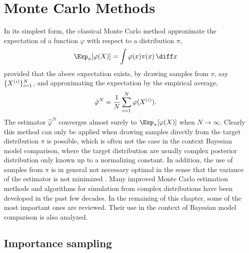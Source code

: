 \chapter{Monte Carlo Methods}
\label{cha:Monte Carlo Methods}

In its simplest form, the classical Monte Carlo method approximate the
expectation of a function $\varphi$ with respect to a distribution $\pi$,
\begin{equation}
  \Exp_{\pi}[\varphi(X)] = \int\varphi(x)\pi(x)\intd x
\end{equation}
provided that the above expectation exists, by drawing \iid samples from
$\pi$, say $\{X^{(i)}\}_{i=1}^N$, and approximating the expectation by the
empirical average,
\begin{equation}
  \hat\varphi^N = \frac{1}{N}\sum_{i=1}^N\varphi(X^{(i)}).
  \label{eq:vanilla mc}
\end{equation}
The estimator $\hat\varphi^N$ converges almost surely to
$\Exp_{\pi}[\varphi(X)]$ when $N\to\infty$. Clearly this method can only be
applied when drawing samples directly from the target distribution $\pi$ is
possible, which is often not the case in the context Bayesian model
comparison, where the target distribution are usually complex posterior
distribution only known up to a normalizing constant. In addition, the use of
samples from $\pi$ is in general not necessary optimal in the sense that the
variance of the estimator is not minimized \cite[][sec.~3.3.2]{Robert:2004tn}.
Many improved Monte Carlo estimation methods and algorithms for simulation
from complex distributions have been developed in the past few decades. In the
remaining of this chapter, some of the most important ones are reviewed. Their
use in the context of Bayesian model comparison is also analyzed.

\section{Importance sampling}
\label{sec:Importance sampling}

